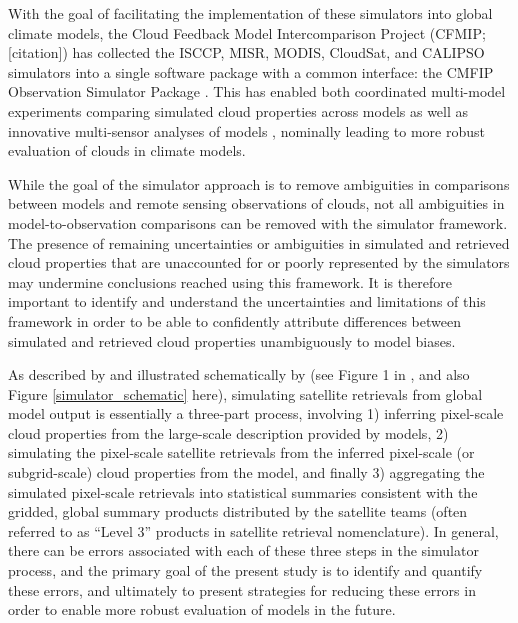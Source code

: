 With the goal of facilitating the implementation of these simulators into global climate models, the Cloud Feedback Model Intercomparison Project (CFMIP; [citation]) has collected the ISCCP, MISR, MODIS, CloudSat, and CALIPSO simulators into a single software package with a common interface: the CMFIP Observation Simulator Package \citep[COSP;][]{bodas-salcedo_et_al_2011}. This has enabled both coordinated multi-model experiments comparing simulated cloud properties across models as well as innovative multi-sensor analyses of models \citep[e.g.,][]{bodas-salcedo_et_al_2011, kay_et_al_2012, klein_et_al_2013}, nominally leading to more robust evaluation of clouds in climate models.

While the goal of the simulator approach is to remove ambiguities in comparisons between models and remote sensing observations of clouds, not all ambiguities in model-to-observation comparisons can be removed with the simulator framework. The presence of remaining uncertainties or ambiguities in simulated and retrieved cloud properties that are unaccounted for or poorly represented by the simulators may undermine conclusions reached using this framework. It is therefore important to identify and understand the uncertainties and limitations of this framework in order to be able to confidently attribute differences between simulated and retrieved cloud properties unambiguously to model biases. 

As described by \cite{pincus_et_al_2012} and illustrated schematically by \cite{bodas-salcedo_et_al_2011} (see Figure 1 in \cite{bodas-salcedo_et_al_2011}, and also Figure \ref{simulator_schematic} here), simulating satellite retrievals from global model output is essentially a three-part process, involving 1) inferring pixel-scale cloud properties from the large-scale description provided by models, 2) simulating the pixel-scale satellite retrievals from the inferred pixel-scale (or subgrid-scale) cloud properties from the model, and finally 3) aggregating the simulated pixel-scale retrievals into statistical summaries consistent with the gridded, global summary products distributed by the satellite teams (often referred to as ``Level 3'' products in satellite retrieval nomenclature). In general, there can be errors associated with each of these three steps in the simulator process, and the primary goal of the present study is to identify and quantify these errors, and ultimately to present strategies for reducing these errors in order to enable more robust evaluation of models in the future.

